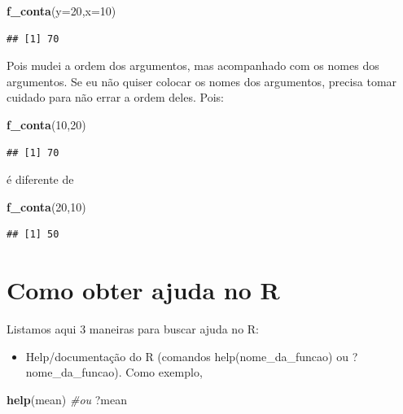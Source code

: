 \documentclass[
]{book}
\newenvironment{Shaded}{\begin{snugshade}}{\end{snugshade}}
\newcommand{\CommentTok}[1]{\textcolor[rgb]{0.56,0.35,0.01}{\textit{#1}}}
\newcommand{\DataTypeTok}[1]{\textcolor[rgb]{0.13,0.29,0.53}{#1}}
\newcommand{\DecValTok}[1]{\textcolor[rgb]{0.00,0.00,0.81}{#1}}
\newcommand{\KeywordTok}[1]{\textcolor[rgb]{0.13,0.29,0.53}{\textbf{#1}}}
\newcommand{\NormalTok}[1]{#1}
\providecommand{\tightlist}{%
  \setlength{\itemsep}{0pt}\setlength{\parskip}{0pt}}
\begin{document}
\begin{Shaded}
\begin{Highlighting}[]
\KeywordTok{f_conta}\NormalTok{(}\DataTypeTok{y=}\DecValTok{20}\NormalTok{,}\DataTypeTok{x=}\DecValTok{10}\NormalTok{)}
\end{Highlighting}
\end{Shaded}

\begin{verbatim}
## [1] 70
\end{verbatim}

Pois mudei a ordem dos argumentos, mas acompanhado com os nomes dos argumentos. Se eu não quiser colocar os nomes dos argumentos, precisa tomar cuidado para não errar a ordem deles. Pois:

\begin{Shaded}
\begin{Highlighting}[]
\KeywordTok{f_conta}\NormalTok{(}\DecValTok{10}\NormalTok{,}\DecValTok{20}\NormalTok{)}
\end{Highlighting}
\end{Shaded}

\begin{verbatim}
## [1] 70
\end{verbatim}

é diferente de

\begin{Shaded}
\begin{Highlighting}[]
\KeywordTok{f_conta}\NormalTok{(}\DecValTok{20}\NormalTok{,}\DecValTok{10}\NormalTok{)}
\end{Highlighting}
\end{Shaded}

\begin{verbatim}
## [1] 50
\end{verbatim}

\hypertarget{como-obter-ajuda-no-r}{%
\section{Como obter ajuda no R}\label{como-obter-ajuda-no-r}}

Listamos aqui 3 maneiras para buscar ajuda no R:

\begin{itemize}
\tightlist
\item
  Help/documentação do R (comandos help(nome\_da\_funcao) ou ?nome\_da\_funcao). Como exemplo,
\end{itemize}

\begin{Shaded}
\begin{Highlighting}[]
\KeywordTok{help}\NormalTok{(mean) }\CommentTok{#ou}
\NormalTok{?mean}
\end{Highlighting}
\end{Shaded}
\end{document}
